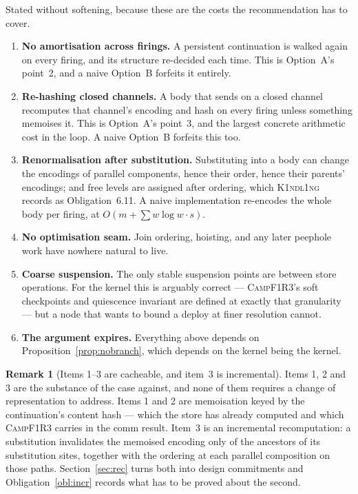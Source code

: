 \documentclass[11pt,a4paper]{article}
\newcommand{\Kind}{\textsc{K1ndl1ng}}
\newcommand{\Camp}{\textsc{CampF1R3}}
\theoremstyle{definition}
\newtheorem{remark}[definition]{Remark}
\theoremstyle{plain}
\begin{document}
Stated without softening, because these are the costs the recommendation has to
cover.

\begin{enumerate}[leftmargin=1.8em,nosep]
\item \textbf{No amortisation across firings.} A persistent continuation is
walked again on every firing, and its structure re-decided each time. This is
Option~A's point~2, and a naive Option~B forfeits it entirely.
\item \textbf{Re-hashing closed channels.} A body that sends on a closed channel
recomputes that channel's encoding and hash on every firing unless something
memoises it. This is Option~A's point~3, and the largest concrete arithmetic
cost in the loop. A naive Option~B forfeits this too.
\item \textbf{Renormalisation after substitution.} Substituting into a body can
change the encodings of parallel components, hence their order, hence their
parents' encodings; and free levels are assigned after ordering, which \Kind{}
records as Obligation~6.11. A naive implementation re-encodes the whole body per
firing, at $O(m+\sum w\log w\cdot s)$.
\item \textbf{No optimisation seam.} Join ordering, hoisting, and any later
peephole work have nowhere natural to live.
\item \textbf{Coarse suspension.} The only stable suspension points are between
store operations. For the kernel this is arguably correct --- \Camp's soft
checkpoints and quiescence invariant are defined at exactly that granularity ---
but a node that wants to bound a deploy at finer resolution cannot.
\item \textbf{The argument expires.} Everything above depends on
Proposition~\ref{prop:nobranch}, which depends on the kernel being the kernel.
\end{enumerate}

\begin{remark}[Items 1--3 are cacheable, and item~3 is incremental]\label{rem:cache}
Items 1, 2 and 3 are the substance of the case against, and none of them
requires a change of representation to address. Items 1 and 2 are memoisation
keyed by the continuation's content hash --- which the store has already
computed and which \Camp{} carries in the comm result. Item~3 is an incremental
recomputation: a substitution invalidates the memoised encoding only of the
ancestors of its substitution sites, together with the ordering at each
parallel composition on those paths. Section~\ref{sec:rec} turns both into
design commitments and Obligation~\ref{obl:incr} records what has to be proved
about the second.
\end{remark}
\end{document}

